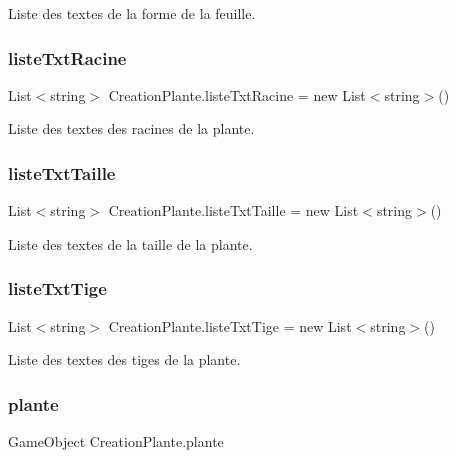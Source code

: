 Liste des textes de la forme de la feuille. \mbox{\label{class_creation_plante_a56f8ddf46f096dcfe343911b965ca9c4}} 
\subsubsection{\texorpdfstring{liste\+Txt\+Racine}{listeTxtRacine}}
{\footnotesize\ttfamily List$<$string$>$ Creation\+Plante.\+liste\+Txt\+Racine = new List$<$string$>$()}

Liste des textes des racines de la plante. \mbox{\label{class_creation_plante_ac5dfac50234fda6051ae3d84f2b50528}} 
\subsubsection{\texorpdfstring{liste\+Txt\+Taille}{listeTxtTaille}}
{\footnotesize\ttfamily List$<$string$>$ Creation\+Plante.\+liste\+Txt\+Taille = new List$<$string$>$()}

Liste des textes de la taille de la plante. \mbox{\label{class_creation_plante_a98188293e42594b907545ac22434a905}} 
\subsubsection{\texorpdfstring{liste\+Txt\+Tige}{listeTxtTige}}
{\footnotesize\ttfamily List$<$string$>$ Creation\+Plante.\+liste\+Txt\+Tige = new List$<$string$>$()}

Liste des textes des tiges de la plante. \mbox{\label{class_creation_plante_a34c60783a4a885ebf9a1ab71401891ac}} 
\subsubsection{\texorpdfstring{plante}{plante}}
{\footnotesize\ttfamily Game\+Object Creation\+Plante.\+plante\hspace{0.3cm}{\ttfamily [static]}}

